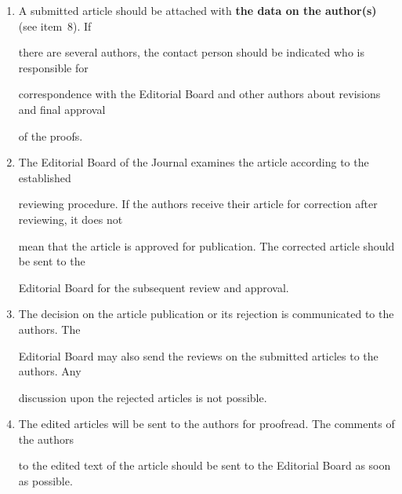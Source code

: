 {\begin{enumerate}[1.]




\item


A submitted article should be attached with \textbf{the data on the author(s)} (see item~8). If


there are several authors, the contact person should be indicated who is responsible for


correspondence with the Editorial Board and other authors about revisions and final approval


of the proofs.\\[-13.5pt]





\item The Editorial Board of the Journal examines the article according to the established


reviewing procedure. If the authors receive their article for correction after reviewing, it does not


mean that the article is approved for publication. The corrected article should be sent to the


Editorial Board for the subsequent review and approval.\\[-13.5pt]





\item The decision on the article publication or its rejection is communicated to the authors. The


Editorial Board may also send the reviews on the submitted articles to the authors. Any


discussion upon the rejected articles is not possible.\\[-13.5pt]





\item The edited articles will be sent to the authors for proofread. The comments of the authors


to the edited text of the article should be sent to the Editorial Board as soon as possible.\\[-13.5pt]






\end{enumerate}}
